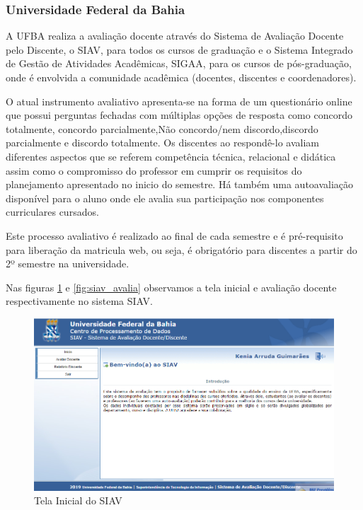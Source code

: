 \documentclass[12pt, a4paper]{report}
\begin{document}
 \subsubsection{Universidade Federal da Bahia}
A UFBA realiza a avaliação docente através do Sistema de Avaliação Docente pelo Discente, o \ac{SIAV}, para todos os cursos de graduação e o Sistema Integrado de Gestão de Atividades Acadêmicas, \ac{SIGAA}, para os cursos de pós-graduação, onde é envolvida a comunidade acadêmica (docentes, discentes e coordenadores).

O atual instrumento avaliativo apresenta-se na forma de um questionário online que possui perguntas fechadas com múltiplas opções de resposta como concordo totalmente, concordo parcialmente,Não concordo/nem discordo,discordo parcialmente e discordo totalmente. Os discentes ao respondê-lo avaliam diferentes aspectos que se referem competência técnica, relacional e didática assim como o compromisso do professor em cumprir os requisitos do planejamento apresentado no inicio do semestre. Há também uma autoavaliação disponível para o aluno onde ele avalia sua participação nos componentes curriculares cursados.

Este processo avaliativo é realizado ao final de cada semestre e é pré-requisito para liberação da matricula web, ou seja, é obrigatório para discentes a partir do 2º semestre na universidade.

Nas figuras \ref{fig:siav_tela} e \ref{fig:siav_avalia} observamos a tela inicial e avaliação docente respectivamente no sistema SIAV.

\begin{figure}
\centering
\includegraphics[scale=0.6]{siav_tela_inicial.png}
\caption{Tela Inicial do SIAV}
\label{fig:siav_tela}
\end{figure}
\end{document}
